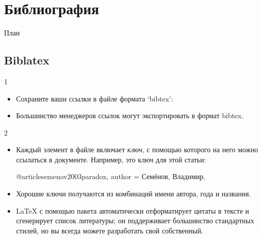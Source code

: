 \documentclass{beamer}
\begin{document}
\section{Библиография}

\begin{frame}{План}
\begin{multicols}{2}
\tableofcontents[currentsection]
\end{multicols}
\end{frame}

\subsection{Biblatex}
\begin{frame}[fragile]{\insertsubsection{} 1}
\vspace{-2ex}
\begin{itemize}
\item Сохраните ваши ссылки в  файле формата `bibtex':
\item Большинство менеджеров ссылок могут экспортировать в формат bibtex.
\end{itemize}
\end{frame}

\begin{frame}[fragile]{\insertsubsection{} 2}
\begin{itemize}
\item Каждый элемент в  файле включает \emph{ключ}, с помощью которого
на него можно ссылаться в документе. Например,  это
ключ для этой статьи:
\begin{bibtexcode}
@article{semenov2003paradox,
  author = {Семёнов, Владимир},
}
\end{bibtexcode}
\item Хорошие ключи получаются из комбинаций имени автора, года и названия.
\item \LaTeX{} с помощью пакета  автоматически отформатирует
цитаты в тексте и сгенерирует список литературы; он поддерживает большинство
стандартных стилей, но вы всегда можете разработать свой собственный.
\end{itemize}
\end{frame}
\end{document}
